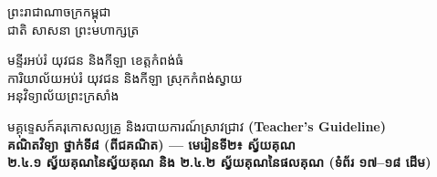 \documentclass[a4paper,12pt]{article}
\newcommand{\en}[1]{{\TimesEn #1}}
\newcommand{\enbf}[1]{{\TimesEn\textbf{#1}}}
\newcommand{\khmflourish}{{\Tacteing\fontsize{38pt}{15pt}\selectfont\raisebox{-5pt}{3}}}
\newcommand{\parttitle}[1]{{\muol\fontsize{14pt}{22pt}\selectfont #1}}
\begin{document}
\thispagestyle{firstpage}
\fontsize{11.5pt}{18.2pt}\selectfont
\vspace*{-0.75cm}

{\linespread{1.08}\selectfont
\begin{center}
  {\muol\fontsize{13.5pt}{21pt}\selectfont ព្រះរាជាណាចក្រកម្ពុជា}\\[2pt]
  {\muol\fontsize{12pt}{18.5pt}\selectfont ជាតិ សាសនា ព្រះមហាក្សត្រ}\\[1pt]
  \khmflourish
\end{center}
\vspace{-4pt}
{\muol\fontsize{10.8pt}{17pt}\selectfont
  មន្ទីរអប់រំ យុវជន និងកីឡា ខេត្តកំពង់ធំ\\
  ការិយាល័យអប់រំ យុវជន និងកីឡា ស្រុកកំពង់ស្វាយ\\
  អនុវិទ្យាល័យព្រះក្រសាំង\par}
\vspace{4pt}
\begin{center}
  \parttitle{មគ្គុទ្ទេសក៍គរុកោសល្យគ្រូ និងរបាយការណ៍ស្រាវជ្រាវ \enbf{(Teacher's Guideline)}}\\[3pt]
  {\fontsize{11.5pt}{18pt}\selectfont\textbf{គណិតវិទ្យា ថ្នាក់ទី៨ \en{(}ពីជគណិត\en{)} \en{---} មេរៀនទី២៖ ស្វ័យគុណ}}\\
  {\fontsize{11.0pt}{17pt}\selectfont\textbf{២.៤.១ ស្វ័យគុណនៃស្វ័យគុណ និង ២.៤.២ ស្វ័យគុណនៃផលគុណ \en{(}ទំព័រ ១៧--១៨ ដើម\en{)}}}
\end{center}
}
\end{document}
